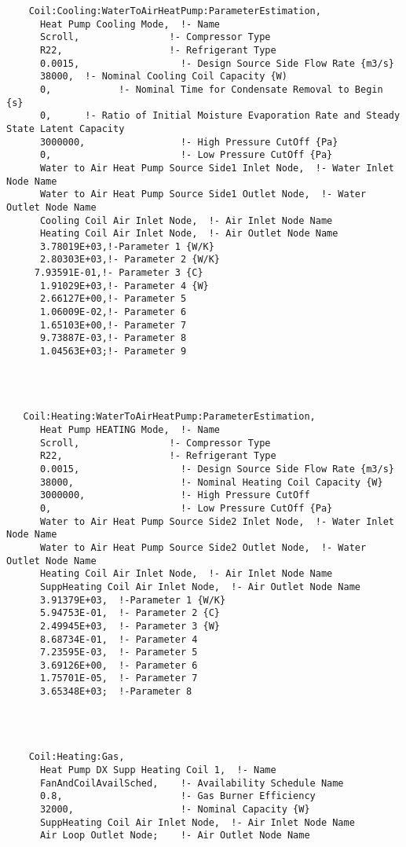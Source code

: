 \begin{lstlisting}
    Coil:Cooling:WaterToAirHeatPump:ParameterEstimation,
      Heat Pump Cooling Mode,  !- Name
      Scroll,                !- Compressor Type
      R22,                   !- Refrigerant Type
      0.0015,                  !- Design Source Side Flow Rate {m3/s}
      38000,  !- Nominal Cooling Coil Capacity {W)
      0,            !- Nominal Time for Condensate Removal to Begin {s}
      0,      !- Ratio of Initial Moisture Evaporation Rate and Steady State Latent Capacity
      3000000,                 !- High Pressure CutOff {Pa}
      0,                       !- Low Pressure CutOff {Pa}
      Water to Air Heat Pump Source Side1 Inlet Node,  !- Water Inlet Node Name
      Water to Air Heat Pump Source Side1 Outlet Node,  !- Water Outlet Node Name
      Cooling Coil Air Inlet Node,  !- Air Inlet Node Name
      Heating Coil Air Inlet Node,  !- Air Outlet Node Name
      3.78019E+03,!-Parameter 1 {W/K}
      2.80303E+03,!- Parameter 2 {W/K}
     7.93591E-01,!- Parameter 3 {C}
      1.91029E+03,!- Parameter 4 {W}
      2.66127E+00,!- Parameter 5
      1.06009E-02,!- Parameter 6
      1.65103E+00,!- Parameter 7
      9.73887E-03,!- Parameter 8
      1.04563E+03;!- Parameter 9




   Coil:Heating:WaterToAirHeatPump:ParameterEstimation,
      Heat Pump HEATING Mode,  !- Name
      Scroll,                !- Compressor Type
      R22,                   !- Refrigerant Type
      0.0015,                  !- Design Source Side Flow Rate {m3/s}
      38000,                   !- Nominal Heating Coil Capacity {W}
      3000000,                 !- High Pressure CutOff
      0,                       !- Low Pressure CutOff {Pa}
      Water to Air Heat Pump Source Side2 Inlet Node,  !- Water Inlet Node Name
      Water to Air Heat Pump Source Side2 Outlet Node,  !- Water Outlet Node Name
      Heating Coil Air Inlet Node,  !- Air Inlet Node Name
      SuppHeating Coil Air Inlet Node,  !- Air Outlet Node Name
      3.91379E+03,  !-Parameter 1 {W/K}
      5.94753E-01,  !- Parameter 2 {C}
      2.49945E+03,  !- Parameter 3 {W}
      8.68734E-01,  !- Parameter 4
      7.23595E-03,  !- Parameter 5
      3.69126E+00,  !- Parameter 6
      1.75701E-05,  !- Parameter 7
      3.65348E+03;  !-Parameter 8




    Coil:Heating:Gas,
      Heat Pump DX Supp Heating Coil 1,  !- Name
      FanAndCoilAvailSched,    !- Availability Schedule Name
      0.8,                     !- Gas Burner Efficiency
      32000,                   !- Nominal Capacity {W}
      SuppHeating Coil Air Inlet Node,  !- Air Inlet Node Name
      Air Loop Outlet Node;    !- Air Outlet Node Name





\end{lstlisting}
